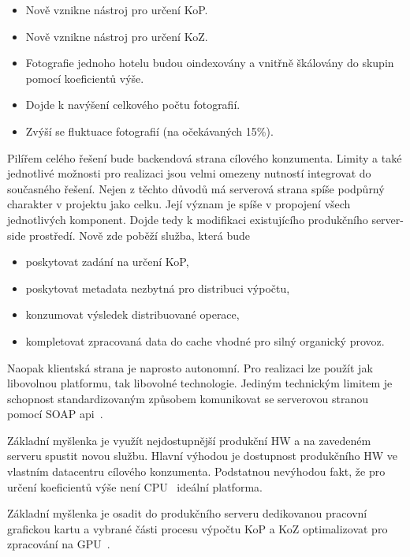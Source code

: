 \begin{itemize}
	\setlength{\parskip}{0pt}
	\setlength{\itemsep}{0pt}
	\item {Nově vznikne nástroj pro určení KoP.}
	\item {Nově vznikne nástroj pro určení KoZ.}
	\item {Fotografie jednoho hotelu budou oindexovány a vnitřně škálovány do skupin pomocí koeficientů výše.}
	\item {Dojde k navýšení celkového počtu fotografií.}
	\item {Zvýší se fluktuace fotografií (na očekávaných 15\%).}
\end{itemize}

Pilířem celého řešení bude backendová strana cílového konzumenta. Limity a také jednotlivé možnosti pro realizaci jsou velmi omezeny nutností integrovat do současného řešení. Nejen z těchto důvodů má serverová strana spíše podpůrný charakter v projektu jako celku. Její význam je spíše v propojení všech jednotlivých komponent. Dojde tedy k modifikaci existujícího produkčního server-side prostředí. Nově zde poběží služba, která bude
\begin{itemize}
	\setlength{\parskip}{0pt}
	\setlength{\itemsep}{0pt}
	\item {poskytovat zadání na určení KoP,}
	\item {poskytovat metadata nezbytná pro distribuci výpočtu,}
	\item {konzumovat výsledek distribuované operace,}
	\item {kompletovat zpracovaná data do cache vhodné pro silný organický provoz.}
\end{itemize}
Naopak klientská strana je naprosto autonomní. Pro realizaci lze použít jak libovolnou platformu, tak libovolné technologie. Jediným technickým limitem je schopnost standardizovaným způsobem komunikovat se serverovou stranou pomocí SOAP api~\cite{soap}.

Základní myšlenka je využít nejdostupnější produkční HW a na zavedeném serveru spustit novou službu. Hlavní výhodou je dostupnost produkčního HW ve vlastním datacentru cílového konzumenta. Podstatnou nevýhodou fakt, že pro určení koeficientů výše není CPU~\cite{cpu} ideální platforma.

Základní myšlenka je osadit do produkčního serveru dedikovanou pracovní grafickou kartu a vybrané části procesu výpočtu KoP a KoZ optimalizovat pro zpracování na GPU~\cite{gpu}.

